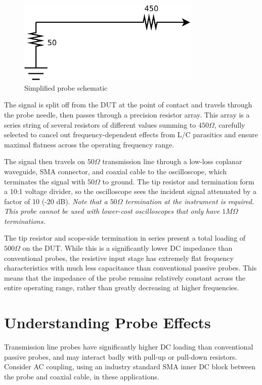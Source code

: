 \documentclass[11pt]{article}
\begin{document}
\begin{figure}[h]
\centering
\includegraphics[height=4cm]{schematic.png}
\caption{Simplified probe schematic}
\label{schematic}
\end{figure}

The signal is split off from the DUT at the point of contact and travels through the probe needle, then passes through
a precision resistor array. This array is a series string of several resistors of different values summing to
$450 \Omega$, carefully selected to cancel out frequency-dependent effects from L/C parasitics and ensure maximal
flatness across the operating frequency range.

The signal then travels on $50 \Omega$ transmission line through a low-loss coplanar waveguide, SMA connector, and
coaxial cable to the oscilloscope, which terminates the signal with $50 \Omega$ to ground. The tip resistor and
termination form a 10:1 voltage divider, so the oscilloscope sees the incident signal attenuated by a factor of 10 (-20
dB). \emph{Note that a $50 \Omega$ termination at the instrument is required. This probe cannot be used with lower-cost
oscilloscopes that only have $1M \Omega$ terminations.}

The tip resistor and scope-side termination in series present a total loading of $500 \Omega$ on the DUT. While this is
a significantly lower DC impedance than conventional probes, the resistive input stage has extremely flat frequency
characteristics with much less capacitance than conventional passive probes. This means that the impedance of the probe
remains relatively constant across the entire operating range, rather than greatly decreasing at higher frequencies.

\section{Understanding Probe Effects}

Transmission line probes have significantly higher DC loading than conventional passive probes, and may interact badly
with pull-up or pull-down resistors. Consider AC coupling, using an industry standard SMA inner DC block between the
probe and coaxial cable, in these applications.
\end{document}
